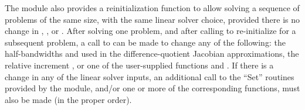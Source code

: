 The {\cvbbdpre} module also provides a reinitialization function to allow
solving a sequence of problems of the same size, with the same linear solver
choice, provided there is no change in , , or .
After solving one problem, and after calling  to
re-initialize {\cvode} for a subsequent problem, a call to 
can be made to change any of the following: the half-bandwidths  and
 used in the difference-quotient Jacobian approximations, the relative
increment , or one of the user-supplied functions  and .
If there is a change in any of the linear solver inputs, an additional call
to the ``Set'' routines provided by the {\sunlinsol} module, and/or
one or more of the corresponding  functions, must
also be made (in the proper order).

